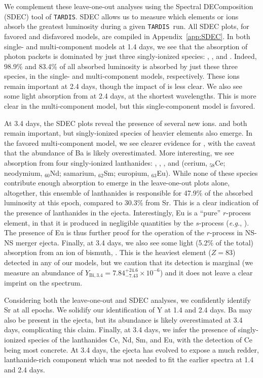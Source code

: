 \documentclass[twocolumn,twocolappendix]{aastex63}
\def\TARDIS{\texttt{TARDIS}}
\begin{document}
We complement these leave-one-out analyses using the Spectral DEComposition (SDEC) tool of \TARDIS. SDEC allows us to measure which elements or ions absorb the greatest luminosity during a given \TARDIS~run. All SDEC plots, for favored and disfavored models, are compiled in Appendix~\ref{app:SDEC}. In both single- and multi-component models at 1.4 days, we see that the absorption of photon packets is dominated by just three singly-ionized species: , , and . Indeed, 98.9\% and 83.4\% of all absorbed luminosity is absorbed by just these three species, in the single- and multi-component models, respectively. These ions remain important at 2.4 days, though the impact of  is less clear. We also see some light absorption from  at 2.4 days, at the shortest wavelengths. This is more clear in the multi-component model, but this single-component model is favored.

At 3.4 days, the SDEC plots reveal the presence of several new ions.  and  both remain important, but singly-ionized species of heavier elements also emerge. In the favored multi-component model, we see clearer evidence for , with the caveat that the abundance of Ba is likely overestimated. More interesting, we see absorption from four singly-ionized lanthanides: , , , and  (cerium, ${}_{58}$Ce; neodymium, ${}_{60}$Nd; samarium, ${}_{62}$Sm; europium, ${}_{63}$Eu). While none of these species contribute enough absorption to emerge in the leave-one-out plots alone, altogether, this ensemble of lanthanides is responsible for 47.9\% of the absorbed luminosity at this epoch, compared to 30.3\% from Sr. This is a clear indication of the presence of lanthanides in the ejecta. Interestingly, Eu is a ``pure'' $r$-process element, in that it is produced in negligible quantities by the $s$-process (\textit{e.g.}, \citealt{bisterzo14}). The presence of Eu is thus further proof for the operation of the $r$-process in NS-NS merger ejecta. Finally, at 3.4 days, we also see some light (5.2\% of the total) absorption from an ion of bismuth, . This is the heaviest element ($Z=83$) detected in any of our models, but we caution that its detection is marginal (we measure an abundance of $Y_{\mathrm{Bi},3.4} = 7.84^{+24.6}_{-7.43} \times 10^{-6}$) and it does not leave a clear imprint on the spectrum. 

Considering both the leave-one-out and SDEC analyses, we confidently identify Sr at all epochs. We solidify our identification of Y at 1.4 and 2.4 days. Ba may also be present in the ejecta, but its abundance is likely overestimated at 3.4 days, complicating this claim. Finally, at 3.4 days, we infer the presence of singly-ionized species of the lanthanides Ce, Nd, Sm, and Eu, with the detection of Ce being most concrete. At 3.4 days, the ejecta has evolved to expose a much redder, lanthanide-rich component which was not needed to fit the earlier spectra at 1.4 and 2.4 days.
\end{document}
